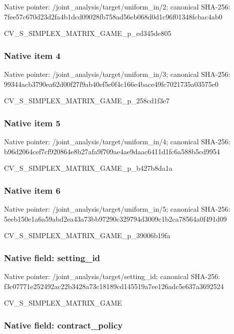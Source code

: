 \documentclass[10pt,a4paper]{article}
\begin{document}
Native pointer: /joint\_analysis/target/uniform\_in/2; canonical SHA-256: 7fee57c670d23d2fa4b1dcd0\allowbreak{}9028fb758ad56eb068d0d1c9\allowbreak{}6f01348fcbac4ab0


CV\_S\_SIMPLEX\_MATRIX\_GAME\_p\_ed345de805


\subsubsection{Native item 4}


Native pointer: /joint\_analysis/target/uniform\_in/3; canonical SHA-256: 99344acb3790ea62d00f27f9\allowbreak{}ab40ef5e0f4c166e4bace49f\allowbreak{}c7021735a03575e0


CV\_S\_SIMPLEX\_MATRIX\_GAME\_p\_258cd1f3e7


\subsubsection{Native item 5}


Native pointer: /joint\_analysis/target/uniform\_in/4; canonical SHA-256: b96d2064cef7cf920864e8b2\allowbreak{}7afa9f709ae4ae9daac6411d\allowbreak{}1fc6a588b5cd9954


CV\_S\_SIMPLEX\_MATRIX\_GAME\_p\_b427b8da1a


\subsubsection{Native item 6}


Native pointer: /joint\_analysis/target/uniform\_in/5; canonical SHA-256: 5eeb150e1a6a59abd2ea43a7\allowbreak{}3bb97290c329794d3009c1b2\allowbreak{}ca78564a0f491d09


CV\_S\_SIMPLEX\_MATRIX\_GAME\_p\_39006b19fa


\subsubsection{Native field: setting\_id}


Native pointer: /joint\_analysis/target/setting\_id; canonical SHA-256: f3c07771e252492ac22b3428\allowbreak{}a73c18189cd145519a7ee126\allowbreak{}adc5e637a3692524


CV\_S\_SIMPLEX\_MATRIX\_GAME


\subsubsection{Native field: contract\_policy}
\end{document}
